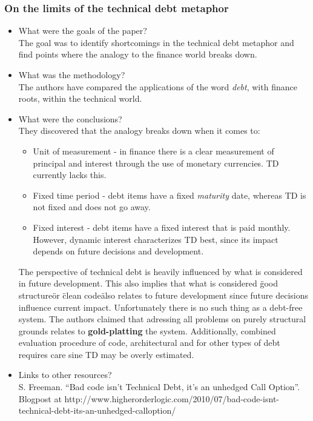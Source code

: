 \documentclass{mprop}
\begin{document}
\subsubsection{On the limits of the technical debt metaphor} \cite{Schmid2013}
\begin{itemize}
	\item What were the goals of the paper? \\
	      The goal was to identify shortcomings in the technical debt metaphor and find points where the analogy to the finance world breaks down.
	\item What was the methodology? \\
	      The authors have compared the applications of the word \textit{debt}, with finance roots, within the technical world.
	\item What were the conclusions? \\
	      They discovered that the analogy breaks down when it comes to:
	      \begin{itemize}
		      \item Unit of measurement - in finance there is a clear measurement of principal and interest through the use of monetary currencies. TD currently lacks this.
		      \item Fixed time period - debt items have a fixed \textit{maturity} date, whereas TD is not fixed and does not go away.
		      \item Fixed interest - debt items have a fixed interest that is paid monthly. However, dynamic interest characterizes TD best, since its impact depends on future decisions and development.
	      \end{itemize}
	      The perspective of technical debt is heavily influenced by what is considered in future development.
	      This also implies that what is considered \"good structure\" or \"clean code\" also relates to future development since future decisions influence current impact.
	      Unfortunately there is no such thing as a debt-free system. The authors claimed that adressing all problems on purely structural grounds relates to \textbf{gold-platting} the system.
	      Additionally, combined evaluation procedure of code, architectural and for other types of debt requires care sine TD may be overly estimated.
	\item Links to other resources? \\
	      S. Freeman. “Bad code isn’t Technical Debt, it’s an unhedged Call Option”. Blogpost at http://www.higherorderlogic.com/2010/07/bad-code-isnt-technical-debt-its-an-unhedged-calloption/
\end{itemize}
\end{document}
